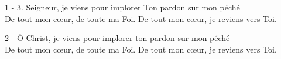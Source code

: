 1 - 3. Seigneur, je viens pour implorer Ton pardon sur mon péché\\
De tout mon cœur, de toute ma Foi. De tout mon cœur, je reviens vers Toi.

2 - Ô Christ, je viens pour implorer ton pardon sur mon péché \\
De tout mon cœur, de toute ma Foi. De tout mon cœur, je reviens vers Toi.

